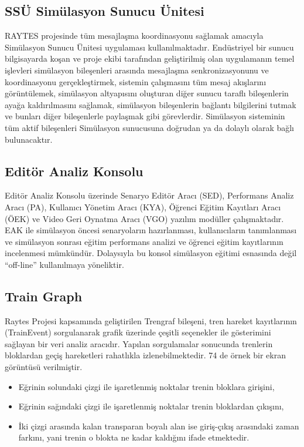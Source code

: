 \documentclass[conference]{IEEEtran}
\begin{document}
\subsection{SSÜ Simülasyon Sunucu Ünitesi}

RAYTES projesinde tüm mesajlaşma koordinasyonu sağlamak amacıyla Simülasyon Sunucu Ünitesi uygulaması kullanılmaktadır. Endüstriyel bir sunucu bilgisayarda koşan ve proje ekibi tarafından geliştirilmiş olan uygulamanın temel işlevleri simülasyon bileşenleri arasında mesajlaşma senkronizasyonunu ve koordinasyonu gerçekleştirmek, sistemin çalışmasını tüm mesaj akışlarını görüntülemek, simülasyon altyapısını oluşturan diğer sunucu taraflı bileşenlerin ayağa kaldırılmasını sağlamak, simülasyon bileşenlerin bağlantı bilgilerini tutmak ve bunları diğer bileşenlerle paylaşmak gibi görevlerdir. Simülasyon sisteminin tüm aktif bileşenleri Simülasyon sunucusuna doğrudan ya da dolaylı olarak bağlı bulunacaktır.
\subsection{Editör Analiz Konsolu}

Editör Analiz Konsolu üzerinde Senaryo Editör Aracı (SED), Performans Analiz Aracı (PA), Kullanıcı Yönetim Aracı (KYA), Öğrenci Eğitim Kayıtları Aracı (ÖEK) ve Video Geri Oynatma Aracı (VGO) yazılım modüller çalışmaktadır.
EAK ile simülasyon öncesi senaryoların hazırlanması, kullanıcıların tanımlanması ve simülasyon sonrası eğitim performans analizi ve öğrenci eğitim kayıtlarının incelenmesi mümkündür. Dolaysıyla bu konsol simülasyon eğitimi esnasında değil “off-line” kullanılmaya yöneliktir.

\subsection{Train Graph}


Raytes Projesi kapsamında geliştirilen Trengraf bileşeni, tren hareket kayıtlarının (TrainEvent) sorgulanarak grafik üzerinde çeşitli seçenekler ile gösterimini sağlayan bir veri analiz aracıdır. Yapılan sorgulamalar sonucunda trenlerin bloklardan geçiş hareketleri rahatlıkla izlenebilmektedir. 74 de örnek bir ekran görüntüsü verilmiştir.


\begin{itemize}
\item Eğrinin solundaki çizgi ile işaretlenmiş noktalar trenin bloklara girişini,
\item Eğrinin sağındaki çizgi ile işaretlenmiş noktalar trenin bloklardan çıkışını,
\item İki çizgi arasında kalan transparan boyalı alan ise giriş-çıkış arasındaki zaman farkını, yani trenin o blokta ne kadar kaldığını ifade etmektedir.
\end{itemize}
\end{document}
